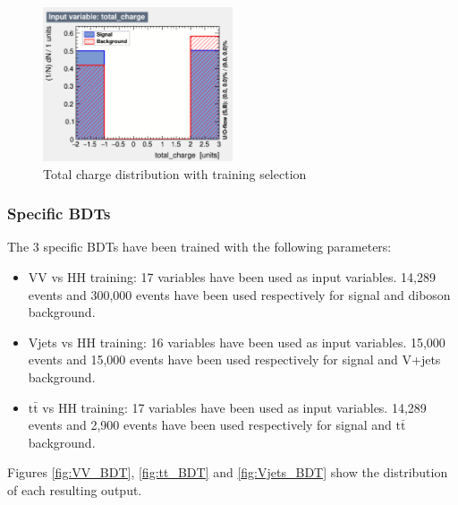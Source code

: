 \begin{figure}[!h]
    \centering
    \includegraphics[width=0.5\textwidth]{figures/2LSS/totQ_distri.png}
    \caption{Total charge distribution with training selection}
    \label{fig:totQ_distri_2LSS}
\end{figure}
 
\subsubsection{Specific BDTs}
The 3 specific BDTs have been trained with the following parameters: 
\begin{itemize}
    \item VV vs HH training: 17 variables have been used as input variables. 14,289 events and 300,000 events have been used respectively for signal and diboson background. 
    \item Vjets vs HH training: 16 variables have been used as input variables. 15,000 events and 15,000 events have been used respectively for signal and V+jets background.
    \item $\mathrm{t\bar{t}}$ vs HH training: 17 variables have been used as input variables. 14,289 events and 2,900 events have been used respectively for signal and $\mathrm{t\bar{t}}$  background.
\end{itemize}
Figures \ref{fig:VV_BDT}, \ref{fig:tt_BDT} and \ref{fig:Vjets_BDT} show the distribution of each resulting output.

